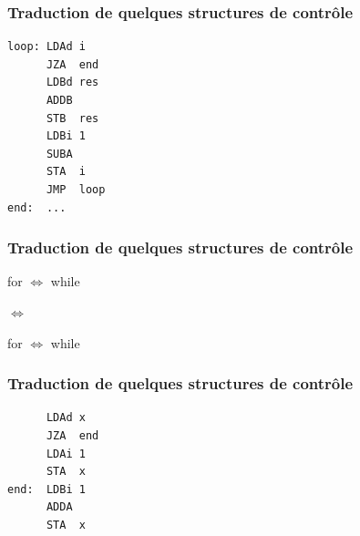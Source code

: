 \documentclass{beamer}
\begin{document}
\begin{frame}[fragile]
\frametitle{Traduction de quelques structures de contrôle}

\begin{algorithmic}[1]
\EndWhile
\end{algorithmic}
\begin{small}
\begin{verbatim}
loop: LDAd i
      JZA  end
      LDBd res
      ADDB
      STB  res
      LDBi 1
      SUBA
      STA  i
      JMP  loop
end:  ...
\end{verbatim}
\end{small}
\end{frame}

\begin{frame}
\frametitle{Traduction de quelques structures de contrôle}
\begin{block}{for $\Leftrightarrow$ while}

\begin{small}
\begin{algorithmic}[1]
\EndFor
\end{algorithmic}

\centering $\Leftrightarrow$

\begin{algorithmic}[1]
\EndWhile
\end{algorithmic}
\end{small}
\end{block}

\begin{block}{for $\Leftrightarrow$ while}
\begin{small}
\begin{algorithmic}[1]
\EndFor
\end{algorithmic}

\begin{algorithmic}[1]
\EndWhile
\end{algorithmic}
\end{small}
\end{block}

\end{frame}

\begin{frame}[fragile]
\frametitle{Traduction de quelques structures de contrôle}

\begin{algorithmic}[1]
\EndIf
{}
\end{algorithmic}

\begin{small}
\begin{verbatim}
      LDAd x
      JZA  end
      LDAi 1
      STA  x
end:  LDBi 1
      ADDA
      STA  x
\end{verbatim}
\end{small}
\end{frame}
\end{document}
